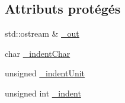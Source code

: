 \subsection*{Attributs protégés}
\begin{DoxyCompactItemize}
\item 
std::ostream \& \hyperlink{classdtd_1_1_output_d_t_d_visitor_a9a93007f2426887a2da46c30c5f2cc42}{\_\-out}
\item 
char \hyperlink{classdtd_1_1_output_d_t_d_visitor_ae58e26bcaaa7c8681209a13934cea5f7}{\_\-indentChar}
\item 
unsigned \hyperlink{classdtd_1_1_output_d_t_d_visitor_a913f11153a7fe38b61ff090d5bd99c89}{\_\-indentUnit}
\item 
unsigned int \hyperlink{classdtd_1_1_output_d_t_d_visitor_a8659c38013b7a5ba99e78c295a224362}{\_\-indent}
\end{DoxyCompactItemize}
